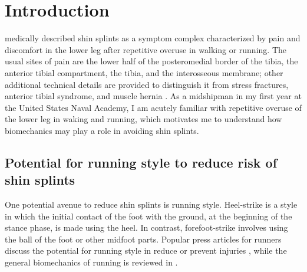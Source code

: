 \section{Introduction}

\citet{slocum1967shin} medically described shin splints as a symptom complex characterized by pain and discomfort in the lower leg after repetitive overuse in walking or running. The usual sites of pain are the lower half of the posteromedial border of the tibia, the anterior tibial compartment, the tibia, and the interosseous membrane; other additional technical details are provided to distinguish it from stress fractures, anterior tibial syndrome, and muscle hernia \citep{slocum1967shin}. As a midshipman in my first year at the United States Naval Academy, I am acutely familiar with repetitive overuse of the lower leg in waking and running, which motivates me to understand how biomechanics may play a role in avoiding shin splints. 

\subsection{Potential for running style to reduce risk of shin splints}
One potential avenue to reduce shin splints is running style. Heel-strike is a style in which the initial contact of the foot with the ground, at the beginning of the stance phase, is made using the heel. In contrast, forefoot-strike involves using the ball of the foot or other midfoot parts. Popular press articles for runners discuss the potential for running style in reduce or prevent injuries \citep{douglas2012midfoot, giandolini2013impact}, while the general biomechanics of running is reviewed in \citep{chan1994foot, lieberman2020biomechanical, bramble2004endurance, lieberman2010foot}. 

